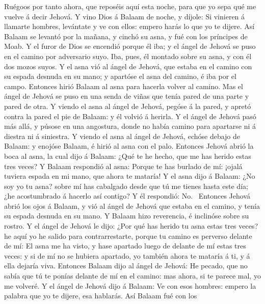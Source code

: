  Ruégoos por tanto ahora, que reposéis aquí esta noche,
para que yo sepa qué me vuelve á decir Jehová.  Y vino
Dios á Balaam de noche, y díjole: Si vinieren á llamarte hombres,
levántate y ve con ellos: empero harás lo que yo te dijere.
 Así Balaam se levantó por la mañana, y cinchó su asna, y
fué con los príncipes de Moab.  Y el furor de Dios se
encendió porque él iba; y el ángel de Jehová se puso en el camino por
adversario suyo. Iba, pues, él montado sobre su asna, y con él dos mozos
suyos.  Y el asna vió al ángel de Jehová, que estaba en
el camino con su espada desnuda en su mano; y apartóse el asna del
camino, é iba por el campo. Entonces hirió Balaam al asna para hacerla
volver al camino.  Mas el ángel de Jehová se puso en una
senda de viñas que tenía pared de una parte y pared de otra.
 Y viendo el asna al ángel de Jehová, pegóse á la pared,
y apretó contra la pared el pie de Balaam: y él volvió á herirla.
 Y el ángel de Jehová pasó más allá, y púsose en una
angostura, donde no había camino para apartarse ni á diestra ni á
siniestra.  Y viendo el asna al ángel de Jehová, echóse
debajo de Balaam: y enojóse Balaam, é hirió al asna con el palo.
 Entonces Jehová abrió la boca al asna, la cual dijo á
Balaam: ¿Qué te he hecho, que me has herido estas tres veces?
 Y Balaam respondió al asna: Porque te has burlado de mí:
¡ojalá tuviera espada en mi mano, que ahora te mataría! 
Y el asna dijo á Balaam: ¿No soy yo tu asna? sobre mí has cabalgado
desde que tú me tienes hasta este día; ¿he acostumbrado á hacerlo así
contigo? Y él respondió: No.~ Entonces Jehová abrió los
ojos á Balaam, y vió al ángel de Jehová que estaba en el camino, y tenía
su espada desnuda en su mano. Y Balaam hizo reverencia, é inclinóse
sobre su rostro.  Y el ángel de Jehová le dijo: ¿Por qué
has herido tu asna estas tres veces? he aquí yo he salido para
contrarrestarte, porque tu camino es perverso delante de mí:
 El asna me ha visto, y hase apartado luego de delante de
mí estas tres veces: y si de mí no se hubiera apartado, yo también ahora
te mataría á ti, y á ella dejaría viva.  Entonces Balaam
dijo al ángel de Jehová: He pecado, que no sabía que tú te ponías
delante de mí en el camino: mas ahora, si te parece mal, yo me volveré.
 Y el ángel de Jehová dijo á Balaam: Ve con esos hombres:
empero la palabra que yo te dijere, esa hablarás. Así Balaam fué con los
